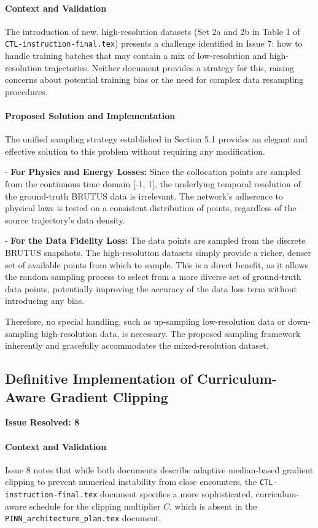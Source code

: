 \paragraph{Context and Validation}
The introduction of new, high-resolution datasets (Set 2a and 2b in Table 1 of \texttt{CTL-instruction-\allowbreak final.tex}) presents a challenge identified in Issue 7: how to handle training batches that may contain a mix of low-resolution and high-resolution trajectories. Neither document provides a strategy for this, raising concerns about potential training bias or the need for complex data resampling procedures.

\paragraph{Proposed Solution and Implementation}
The unified sampling strategy established in Section 5.1 provides an elegant and effective solution to this problem without requiring any modification.


- \textbf{For Physics and Energy Losses:} Since the collocation points are sampled from the continuous time domain [-1, 1], the underlying temporal resolution of the ground-truth BRUTUS data is irrelevant. The network's adherence to physical laws is tested on a consistent distribution of points, regardless of the source trajectory's data density.

- \textbf{For the Data Fidelity Loss:} The data points are sampled from the discrete BRUTUS snapshots. The high-resolution datasets simply provide a richer, denser set of available points from which to sample. This is a direct benefit, as it allows the random sampling process to select from a more diverse set of ground-truth data points, potentially improving the accuracy of the data loss term without introducing any bias.

Therefore, no special handling, such as up-sampling low-resolution data or down-sampling high-resolution data, is necessary. The proposed sampling framework inherently and gracefully accommodates the mixed-resolution dataset.

\subsection{Definitive Implementation of Curriculum-Aware Gradient Clipping}
\textbf{Issue Resolved: 8}
\paragraph{Context and Validation}
Issue 8 notes that while both documents describe adaptive median-based gradient clip\-ping to prevent numerical instability from close encounters, the \texttt{CTL-instruction-\allowbreak final.tex} document specifies a more sophisticated, curriculum-aware schedule for the clipping multiplier $C$, which is absent in the \texttt{PINN\_\allowbreak architecture\_\allowbreak plan.tex} document.

